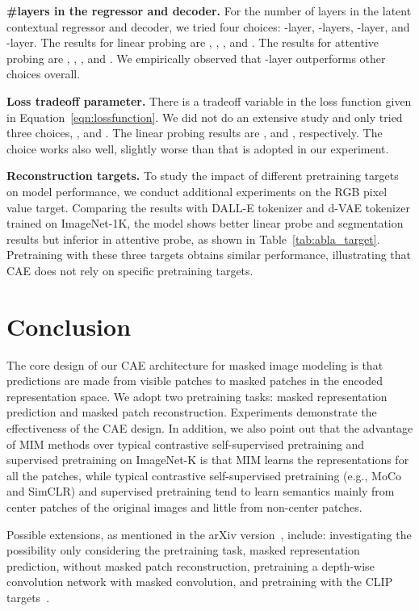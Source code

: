 \documentclass[twocolumn]{svjour3}          \smartqed  \usepackage{graphicx}
\begin{document}
\vspace{1mm}
\noindent\textbf{\#layers in the regressor and decoder.} 
For the number of layers in the latent contextual regressor and decoder, we tried four choices: -layer, -layers, -layer, and -layer. The results for linear probing are , , , and . The results for attentive probing are , , , and .
We empirically observed that -layer outperforms other choices overall.

\vspace{1mm}
\noindent\textbf{Loss tradeoff parameter.}
There is a tradeoff variable 
in the loss function given in Equation~\ref{eqn:lossfunction}.
We did not do an extensive study
and only tried three choices, 
,  and .
The linear probing results are ,  and , respectively.
The choice  works also well, slightly worse than  that is adopted in our experiment.


\vspace{1mm}
\noindent\textbf{Reconstruction targets.}
To study the impact of different pretraining targets on model performance, we conduct additional experiments on the RGB pixel value target. Comparing the results with DALL-E tokenizer and d-VAE tokenizer trained on ImageNet-1K, the model shows better linear probe and segmentation results but inferior in attentive probe, as shown in Table~\ref{tab:abla_target}. Pretraining with these three targets obtains similar performance, illustrating that CAE does not rely on specific pretraining targets.


\section{Conclusion}
The core design
of our CAE architecture 
for masked image modeling
is that predictions are made
from visible patches
to masked patches
in the encoded representation space.
We adopt two pretraining tasks:
masked representation prediction
and masked patch reconstruction.
Experiments demonstrate
the effectiveness of the CAE design.
In addition,
we also point out that
the advantage of MIM methods
over typical contrastive self-supervised pretraining
and supervised pretraining on ImageNet-K
is that MIM learns the representations
for all the patches,
while 
typical contrastive self-supervised pretraining (e.g., MoCo and SimCLR)
and supervised pretraining
tend to learn semantics
mainly from center patches
of the original images
and little from non-center patches.

Possible extensions, 
as mentioned in the arXiv version~\cite{CAE2022},
include:
investigating the possibility only 
considering the pretraining task,
masked representation prediction,
without masked patch reconstruction,
pretraining a depth-wise convolution network with masked convolution,
and pretraining with the CLIP targets~\cite{CAEv22022}.
\end{document}
